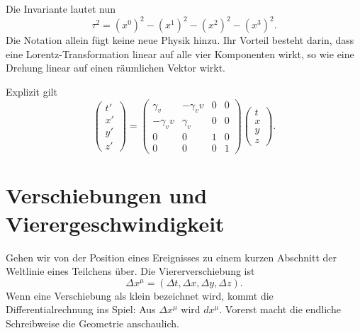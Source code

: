 Die Invariante lautet nun
\begin{equation}
\tau^2
=(x^0)^2-(x^1)^2-(x^2)^2-(x^3)^2.
\end{equation}
Die Notation allein fügt keine neue Physik hinzu. Ihr Vorteil besteht darin, dass eine Lorentz-Transformation linear auf alle vier Komponenten wirkt, so wie eine Drehung linear auf einen räumlichen Vektor wirkt.

\begin{classroomqa}
\end{classroomqa}

Explizit gilt
\begin{equation}
\begin{pmatrix}
t'\\x'\\y'\\z'
\end{pmatrix}
=
\begin{pmatrix}
\gamma_v&-\gamma_v v&0&0\\
-\gamma_v v&\gamma_v&0&0\\
0&0&1&0\\
0&0&0&1
\end{pmatrix}
\begin{pmatrix}
t\\x\\y\\z
\end{pmatrix}.
\label{eq:sr2-boost-matrix}
\end{equation}

\section{Verschiebungen und Vierergeschwindigkeit}

Gehen wir von der Position eines Ereignisses zu einem kurzen Abschnitt der Weltlinie eines Teilchens über. Die Viererverschiebung ist
\begin{equation}
\Delta x^\mu
=(\Delta t,\Delta x,\Delta y,\Delta z).
\end{equation}
Wenn eine Verschiebung als klein bezeichnet wird, kommt die Differentialrechnung ins Spiel: Aus \(\Delta x^\mu\) wird \(dx^\mu\). Vorerst macht die endliche Schreibweise die Geometrie anschaulich.

